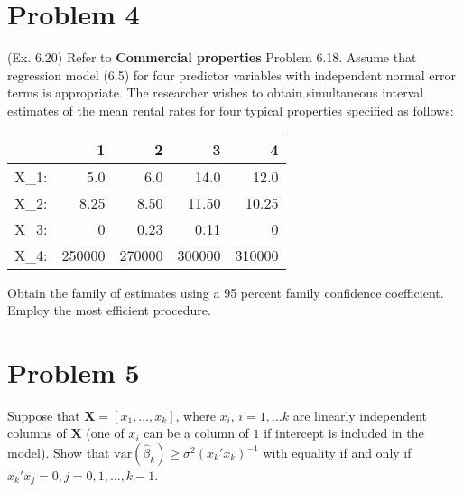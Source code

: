 \documentclass[10pt]{report}
\newcommand{\var} {\text{var}}
\begin{document}
\section*{Problem 4}
(Ex. 6.20) Refer to \textbf{Commercial properties} Problem 6.18. Assume that regression model (6.5) for four predictor variables with independent normal error terms is appropriate. The researcher wishes to obtain simultaneous interval estimates of the mean rental rates for four typical properties specified as follows:
\begin{table}[H]
	\centering
	\begin{tabular}{*{5}{N}}
		& 1 & 2 & 3 & 4 \\ \midrule
		X_1: & 5.0 & 6.0 & 14.0 & 12.0 \\
		X_2: & 8.25 & 8.50 & 11.50 & 10.25 \\
		X_3: & 0 & 0.23 & 0.11 & 0 \\
		X_4: & 250000 & 270000 & 300000 & 310000 \\
	\end{tabular}
\end{table}
Obtain the family of estimates using a 95 percent family confidence coefficient. Employ the most efficient procedure.

\section*{Problem 5}
Suppose that $\mathbf X = [x_1, \dots, x_k]$, where $x_i$, $i=1, \dots k$ are linearly independent columns of $\mathbf X$ (one of $x_i$ can be a column of $1$ if intercept is included in the model). Show that $\var(\hat{\beta}_k) \ge \sigma^2(x_k' x_k)^{-1}$ with equality if and only if $x_k' x_j = 0, j=0,1,\dots,k-1$.
\end{document}
